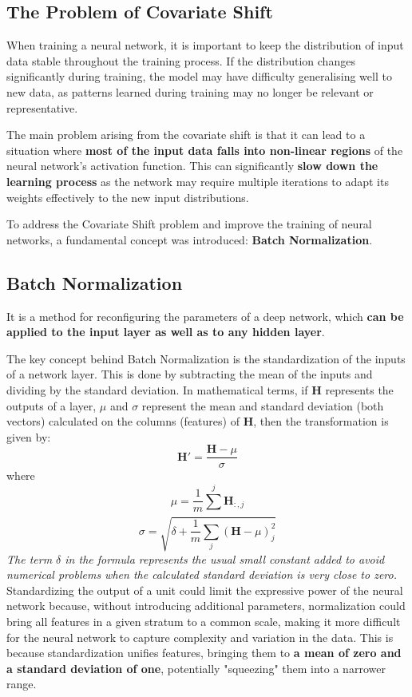 \subsection{The Problem of Covariate Shift}

When training a neural network, it is important to keep the distribution of input data stable throughout the training process. If the distribution changes significantly during training, the model may have difficulty generalising well to new data, as patterns learned during training may no longer be relevant or representative.

The main problem arising from the covariate shift is that it can lead to a situation where \textbf{most of the input data falls into non-linear regions} of the neural network's activation function. This can significantly \textbf{slow down the learning process} as the network may require multiple iterations to adapt its weights effectively to the new input distributions.

To address the Covariate Shift problem and improve the training of neural networks, a fundamental concept was introduced: \textbf{Batch Normalization}.

\subsection{Batch Normalization}

It is a method for reconfiguring the parameters of a deep network, which \textbf{can be applied to the input layer as well as to any hidden layer}.

The key concept behind Batch Normalization is the standardization of the inputs of a network layer. This is done by subtracting the mean of the inputs and dividing by the standard deviation. In mathematical terms, if $ \mathbf{H} $ represents the outputs of a layer, $ \mu $ and $ \sigma $ represent the mean and standard deviation (both vectors) calculated on the columns (features) of $ \mathbf{H} $, then the transformation is given by:
$$ \mathbf{H}' = \frac{\mathbf{H} - \mu}{\sigma} $$ where $$\mu = \frac{1}{m}\sum_{}^{j}\mathbf{H}_{:,j}$$
$$\sigma = \sqrt{\delta + \frac{1}{m}\sum_{j}^{}(\mathbf{H}-\mu)^2_j}$$
\textit{The term $\delta$ in the formula represents the usual small constant added to avoid numerical problems when the calculated standard deviation is very close to zero. }
Standardizing the output of a unit could limit the expressive power of the neural network because, without introducing additional parameters, normalization could bring all features in a given stratum to a common scale, making it more difficult for the neural network to capture complexity and variation in the data. This is because standardization unifies features, bringing them to \textbf{a mean of zero and a standard deviation of one}, potentially "squeezing" them into a narrower range.

